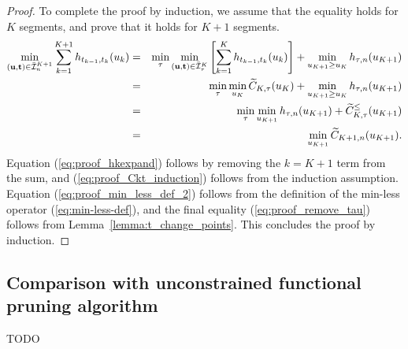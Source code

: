 \documentclass{article}
\begin{document}
\begin{proof}
To complete the proof by induction, we assume that the equality holds for
$K$ segments, and prove that it holds for $K+1$ segments.
\begin{eqnarray}
  \label{eq:proof_separate_tau}
  \min_{(\mathbf u, \mathbf t)\in\bar{\mathcal I}_n^{K+1}}
  \sum_{k=1}^{K+1}
  h_{t_{k-1}, t_k}(u_k)
  &= & \label{eq:proof_hkexpand}\min_\tau
  \min_{(\mathbf u, \mathbf t)\in\bar{\mathcal I}_\tau^K}
       \left[
       \sum_{k=1}^K
       h_{t_{k-1},t_k}(u_k)
       \right]
       +\min_{u_{K+1}\geq u_K}
       h_{\tau, n} (u_{K+1})\\
&=& \min_\tau\min_{u_K} \widetilde{C}_{K,\tau}(u_K)\label{eq:proof_Ckt_induction}
    +\min_{u_{K+1}\geq u_K} h_{\tau,n}(u_{K+1})\\
&=& \min_\tau \min_{u_{K+1}} h_{\tau,n}(u_{K+1})\label{eq:proof_min_less_def_2}
+\widetilde{C}_{K,\tau}^\leq(u_{K+1})\\
&=& \min_{u_{K+1}} \widetilde{C}_{K+1,n}(u_{K+1}).\label{eq:proof_remove_tau}
\end{eqnarray}
Equation (\ref{eq:proof_hkexpand}) follows by removing the $k=K+1$
term from the sum, and (\ref{eq:proof_Ckt_induction}) follows from the
induction assumption. Equation (\ref{eq:proof_min_less_def_2}) follows
from the definition of the min-less operator (\ref{eq:min-less-def}),
and the final equality (\ref{eq:proof_remove_tau}) follows from
Lemma~\ref{lemma:t_change_points}. This concludes the proof by induction.
\end{proof}

\subsection{Comparison with unconstrained functional pruning
  algorithm}

TODO

\end{document}
